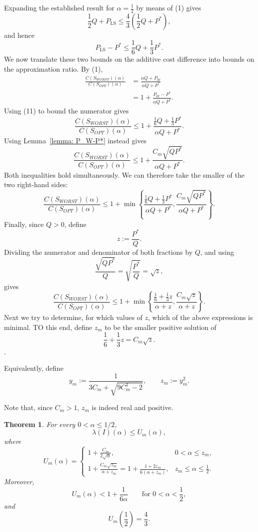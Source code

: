 \documentclass[11pt]{article}
\newtheorem{theorem}{Theorem}
\newcommand{\LS}{\mathrm{LS}}
\begin{document}
Expanding the established result for $\alpha = \frac12$ by means of (1) gives
\[
 \frac12Q+P_{\LS}
 \le
 \frac43\left(\frac12Q+P^*\right),
\]
and hence
\[
 P_{\LS}-P^*\le\frac16Q+\frac13P^*.
\tag{11}
\]
We now translate these two bounds on the additive cost difference into
bounds on the approximation ratio. By (1),
\[
\begin{aligned}
\frac{C(S_{WORST})(\alpha)}{C(S_{OPT})(\alpha)}
&=
\frac{\alpha Q+P_W}{\alpha Q+P^*}\\
&=
1+\frac{P_W-P^*}{\alpha Q+P^*}.
\end{aligned}
\]
Using (11) to bound the numerator gives
\[
\frac{C(S_{WORST})(\alpha)}{C(S_{OPT})(\alpha)}
\le
1+
\frac{\frac16Q+\frac13P^*}{\alpha Q+P^*}.
\]
Using Lemma~\ref{lemma: P_W-P*} instead gives
\[
\frac{C(S_{WORST})(\alpha)}{C(S_{OPT})(\alpha)}
\le
1+
\frac{C_m\sqrt{QP^*}}{\alpha Q+P^*}.
\]
Both inequalities hold simultaneously. We can therefore take the smaller
of the two right-hand sides:
\[
\frac{C(S_{WORST})(\alpha)}{C(S_{OPT})(\alpha)}
\le
1+
\min\left\{
\frac{\frac16Q+\frac13P^*}{\alpha Q+P^*},
\frac{C_m\sqrt{QP^*}}{\alpha Q+P^*}
\right\}.
\]
Finally, since \(Q>0\), define
\[
 z:=\frac{P^*}{Q}.
\]
Dividing the numerator and denominator of both fractions by \(Q\), and
using
\[
\frac{\sqrt{QP^*}}{Q}
=
\sqrt{\frac{P^*}{Q}}
=\sqrt z,
\]
gives
\[
 \frac{C(S_{WORST})(\alpha)}{C(S_{OPT})(\alpha)}
 \le
 1+
 \min\left\{
 \frac{\frac16+\frac13z}{\alpha+z},
 \frac{C_m\sqrt z}{\alpha+z}
 \right\}.
\tag{12}
\]
Next we try to determine, for which values of $z$, which of the above expressions is minimal. 
TO this end, define \(z_m\)  to be the smaller positive solution of
\[
 \frac16+\frac13z=C_m\sqrt z.
\tag{13}
\]. 

Equivalently, define
\[
 y_m:=
 \frac{1}{3C_m+\sqrt{9C_m^2-2}},
 \qquad
 z_m:=y_m^2.
\tag{14}
\]

Note that, since $C_m > 1$, $z_m$ is indeed real and positive. 

\begin{theorem}
\label{thm:main}
For every \(0<\alpha\le1/2\),
\[
 \lambda(I)(\alpha)
 \le U_m(\alpha),
\tag{15}
\]
where
\[
 U_m(\alpha)=
 \begin{cases}
 \displaystyle
 1+\frac{C_m}{2\sqrt\alpha},
 &0<\alpha\le z_m,\\[3mm]
 \displaystyle
 1+\frac{C_m\sqrt{z_m}}{\alpha+z_m}
 =
 1+\frac{1+2z_m}{6(\alpha+z_m)},
 &z_m\le\alpha\le\frac12.
 \end{cases}
\tag{16}
\]
Moreover,
\[
 U_m(\alpha)<1+\frac{1}{6\alpha}
 \qquad\text{for }0<\alpha<\frac12,
\tag{17}
\]
and
\[
 U_m\left(\frac12\right)=\frac43.
\tag{18}
\]
\end{theorem}
\end{document}
